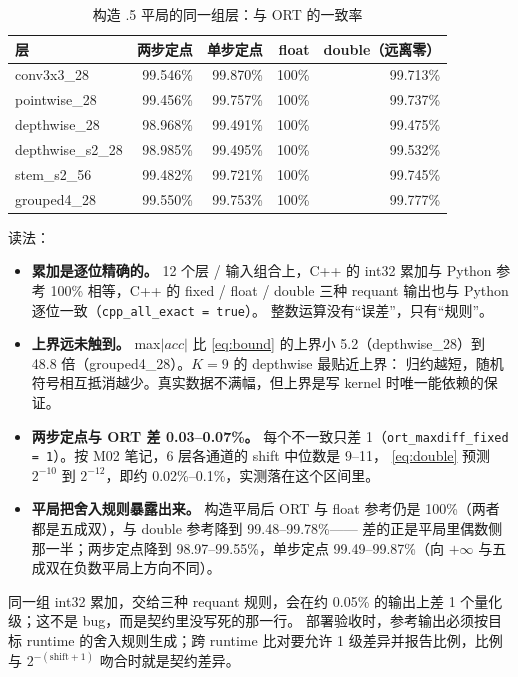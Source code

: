 \documentclass[11pt,a4paper]{ctexart}
\begin{document}
\begin{table}[H]
\centering\small
\caption{构造 .5 平局的同一组层：与 ORT 的一致率}\label{tab:ties}
\begin{tabular}{lrrrr}
\toprule
层 & 两步定点 & 单步定点 & float & double（远离零） \\
\midrule
conv3x3\_28 & 99.546\% & 99.870\% & 100\% & 99.713\% \\
pointwise\_28 & 99.456\% & 99.757\% & 100\% & 99.737\% \\
depthwise\_28 & 98.968\% & 99.491\% & 100\% & 99.475\% \\
depthwise\_s2\_28 & 98.985\% & 99.495\% & 100\% & 99.532\% \\
stem\_s2\_56 & 99.482\% & 99.721\% & 100\% & 99.745\% \\
grouped4\_28 & 99.550\% & 99.753\% & 100\% & 99.777\% \\
\bottomrule
\end{tabular}
\end{table}

读法：

\begin{itemize}
  \item \textbf{累加是逐位精确的。} 12 个层 / 输入组合上，C++ 的 int32 累加与 Python 参考 100\% 相等，C++ 的 fixed / float / double 三种 requant 输出也与 Python 逐位一致（\texttt{cpp\_all\_exact = true}）。
        整数运算没有“误差”，只有“规则”。
  \item \textbf{上界远未触到。} max$|acc|$ 比 \cref{eq:bound} 的上界小 5.2（depthwise\_28）到 48.8 倍（grouped4\_28）。$K=9$ 的 depthwise 最贴近上界：
        归约越短，随机符号相互抵消越少。真实数据不满幅，但上界是写 kernel 时唯一能依赖的保证。
  \item \textbf{两步定点与 ORT 差 0.03--0.07\%。} 每个不一致只差 1（\texttt{ort\_maxdiff\_fixed = 1}）。按 M02 笔记，6 层各通道的 shift 中位数是 9--11，
        \cref{eq:double} 预测 $2^{-10}$ 到 $2^{-12}$，即约 0.02\%--0.1\%，实测落在这个区间里。
  \item \textbf{平局把舍入规则暴露出来。} 构造平局后 ORT 与 float 参考仍是 100\%（两者都是五成双），与 double 参考降到 99.48--99.78\%——
        差的正是平局里偶数侧那一半；两步定点降到 98.97--99.55\%，单步定点 99.49--99.87\%（向 $+\infty$ 与五成双在负数平局上方向不同）。
\end{itemize}

\begin{findingbox}[：位级一致只在同一种舍入规则内成立]
同一组 int32 累加，交给三种 requant 规则，会在约 0.05\% 的输出上差 1 个量化级；这不是 bug，而是契约里没写死的那一行。
部署验收时，参考输出必须按目标 runtime 的舍入规则生成；跨 runtime 比对要允许 1 级差异并报告比例，比例与 $2^{-(\mathrm{shift}+1)}$ 吻合时就是契约差异。
\end{findingbox}
\end{document}
